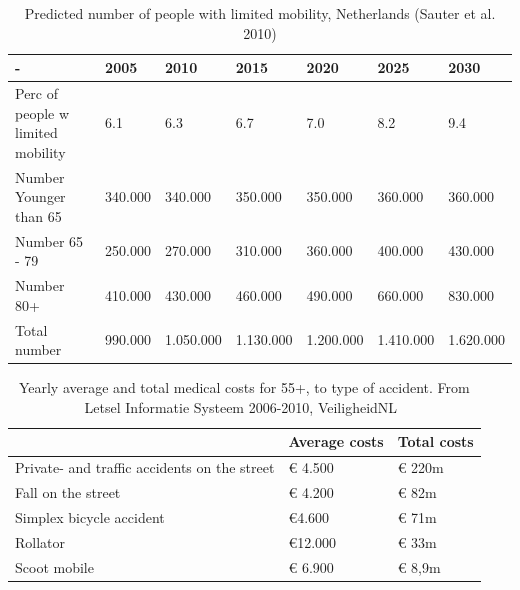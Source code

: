 \begin{table}[h]
	\caption[Predicted number of people with limited mobility]{Predicted number of people with limited mobility, Netherlands (Sauter et al. 2010)}
	\label{nrpeople}
	\centering
	\begin{tabular}{|p{63.6pt}|p{44pt}|p{44pt}|p{44pt}|p{44pt}|p{44pt}|p{44pt}|} 
		\hline 
		-& 2005 & 2010 & 2015 & 2020 & 2025 & 2030 \\
		\hline
		Perc of people w limited mobility & 6.1 & 6.3 & 6.7 & 7.0 & 8.2 & 9.4 \\ 
		Number Younger than 65 & 340.000 & 340.000 & 350.000 & 350.000 & 360.000 & 360.000 \\
		Number 65 - 79 & 250.000 & 270.000 & 310.000 & 360.000 & 400.000 & 430.000 \\
		Number 80+ & 410.000 & 430.000 & 460.000 & 490.000 & 660.000 & 830.000 \\
		\hline
		Total number & 990.000 & 1.050.000 & 1.130.000 & 1.200.000 & 1.410.000 & 1.620.000\\
		\hline
	\end{tabular}
\end{table}

\renewcommand{\arraystretch}{1.5}
\renewcommand{\tabcolsep}{0.2cm}
\begin{table}[h]
\caption{Yearly average and total medical costs for 55+, to type of accident. From Letsel Informatie Systeem 2006-2010, VeiligheidNL~\cite{DenHertog2013} \label{costsaccident} }
\centering
\begin{tabular}{|p{236.2pt}|p{70.4pt}|p{70.4pt}|} 
\hline 
& Average costs & Total costs \\
\hline
Private- and traffic accidents on the street & \euro{} 4.500 & \euro{} 220m \\
Fall on the street & \euro{} 4.200 & \euro{} 82m \\
Simplex bicycle accident & \euro{}4.600 & \euro{} 71m \\ 
Rollator & \euro{}12.000 & \euro{} 33m\\ 
Scoot mobile & \euro{} 6.900 & \euro{} 8,9m \\
\hline
\end{tabular}
\end{table}


